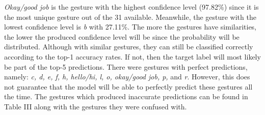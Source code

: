 \documentclass[journal]{./IEEE/IEEEtran}
\begin{document}
\indent \textit{Okay/good job} is the gesture with the highest confidence level (97.82\%) since it is the most unique gesture out of the 31 available. Meanwhile, the gesture with the lowest confidence level is \textit{b} with 27.11\%. The more the gestures have similarities, the lower the produced confidence level will be since the probability will be distributed. Although with similar gestures, they can still be classified correctly according to the top-1 accuracy rates. If not, then the target label will most likely be part of the top-5 predictions.
\newline
\indent There were gestures with perfect predictions, namely: \textit{c, d, e, f, h, hello/hi, l, o, okay/good job, p,} and \textit{r}. However, this does not guarantee that the model will be able to perfectly predict these gestures all the time. The gestures which produced inaccurate predictions can be found in Table III along with the gestures they were confused with.
\end{document}
